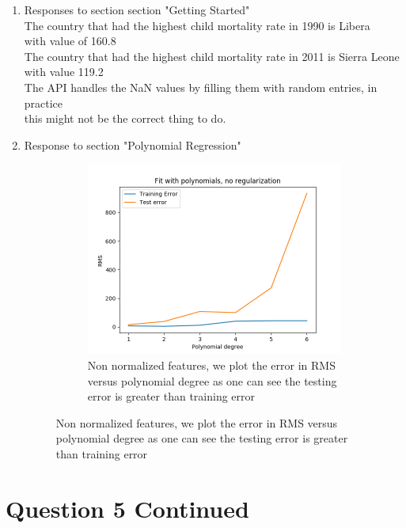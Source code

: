 \documentclass{article}
\begin{document}
\begin{enumerate}
	\item Responses to section section "Getting Started"
	\\ The country that had the highest child mortality rate in 1990 is Libera
	\\ with value of 160.8
	\\ The country that had the highest child mortality rate in 2011 is Sierra Leone
	\\ with value 119.2
	\\ The API handles the NaN values by filling them with random entries, in practice
	\\ this might not be the correct thing to do.

	\item Response to section "Polynomial Regression"
	\\
	\begin{figure}[h!]
		\centering
		\begin{subfigure}[b]{0.4\linewidth}
			\includegraphics[width=\linewidth]{Error_vs_PolyDegree.png}
			\caption{Non normalized features, we plot the error in RMS versus polynomial degree as one can see the testing error is greater than training error}
		\end{subfigure}
		
	\end{figure}
\end{enumerate}

\pagebreak



\section{Question 5 Continued}\label{sec:Question5Continued}
\end{document}
